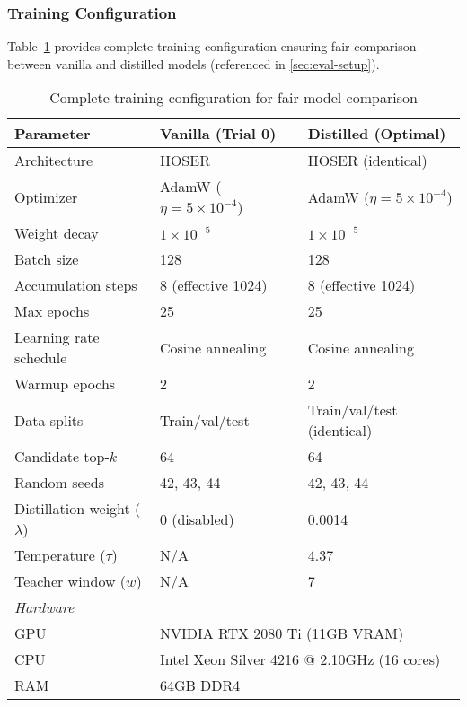 \subsubsection{Training Configuration}
\label{app:training-config}

Table~\ref{tab:training-config-appendix} provides complete training configuration ensuring fair comparison between vanilla and distilled models (referenced in \autoref{sec:eval-setup}).

\begin{table}[H]
\centering
\caption{Complete training configuration for fair model comparison}
\label{tab:training-config-appendix}
\begin{tabular}{lll}
\toprule
\textbf{Parameter} & \textbf{Vanilla (Trial 0)} & \textbf{Distilled (Optimal)} \\
\midrule
Architecture & HOSER & HOSER (identical) \\
Optimizer & AdamW ($\eta = 5 \times 10^{-4}$) & AdamW ($\eta = 5 \times 10^{-4}$) \\
Weight decay & $1 \times 10^{-5}$ & $1 \times 10^{-5}$ \\
Batch size & 128 & 128 \\
Accumulation steps & 8 (effective 1024) & 8 (effective 1024) \\
Max epochs & 25 & 25 \\
Learning rate schedule & Cosine annealing & Cosine annealing \\
Warmup epochs & 2 & 2 \\
Data splits & Train/val/test & Train/val/test (identical) \\
Candidate top-$k$ & 64 & 64 \\
Random seeds & 42, 43, 44 & 42, 43, 44 \\
\midrule
Distillation weight ($\lambda$) & 0 (disabled) & 0.0014 \\
Temperature ($\tau$) & N/A & 4.37 \\
Teacher window ($w$) & N/A & 7 \\
\midrule
\multicolumn{3}{l}{\textit{Hardware}} \\
\quad GPU & \multicolumn{2}{l}{NVIDIA RTX 2080 Ti (11GB VRAM)} \\
\quad CPU & \multicolumn{2}{l}{Intel Xeon Silver 4216 @ 2.10GHz (16 cores)} \\
\quad RAM & \multicolumn{2}{l}{64GB DDR4} \\
\bottomrule
\end{tabular}
\end{table}

